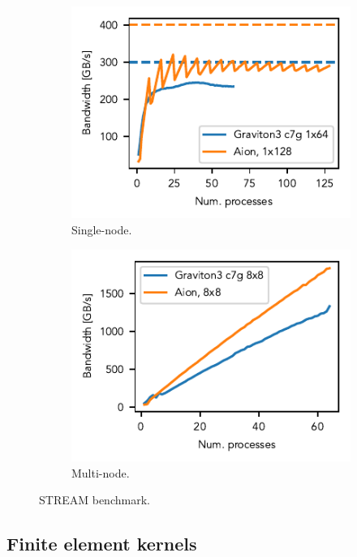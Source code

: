 \begin{figure}
    \begin{subfigure}{.5\textwidth}
        \includegraphics{chapters/chp1/imgs/stream_plots/stream_single_node.pdf}
        \caption{Single-node.}
        \label{fig:stream-single}
    \end{subfigure}%
    \begin{subfigure}{.5\textwidth}
        \includegraphics{chapters/chp1/imgs/stream_plots/stream_multi_node.pdf}
        \caption{Multi-node.}
        \label{fig:stream-multiple}
    \end{subfigure}
    \caption{STREAM benchmark.}
\end{figure}

\subsection*{Finite element kernels}

